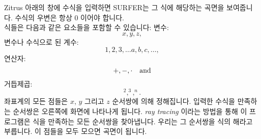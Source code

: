 \begin{surferPage}{Zitrus}
아래의 창에 수식을 입력하면 SURFER는 그 식에 해당하는 곡면을 보여줍니다. 수식의 우변은 항상 0 이어야 합니다.
\\
식들은 다음과 같은 요소들을 포함할 수 있습니다:
\newline
변수:
\[x, y, z, \]
변수나 수식으로 된 계수:
\[1, 2, 3, \dots a, b, c, \dots, \]
연산자:
\[+,  - , \cdot \quad \textnormal{and} \]
거듭제곱:
\[ ^2, ^3, ^n .\]
좌표계의 모든 점들은 $x$, $y$ 그리고 $z$ 순서쌍에 의해 정해집니다. 입력한 수식을 만족하는 순서쌍은 오른쪽에 화면에 나타나게 됩니다. \textit{ray tracing} 이라는 방법을 통해 이 프로그램은 식을 만족하는 모든 순서쌍을 찾아냅니다. 우리는 그 순서쌍을 식의 해라고 부릅니다. 이 점들을 모두 모으면 곡면이 됩니다.
\end{surferPage}
